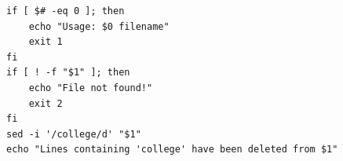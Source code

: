 \begin{verbatim}
if [ $# -eq 0 ]; then
    echo "Usage: $0 filename"
    exit 1
fi
if [ ! -f "$1" ]; then
    echo "File not found!"
    exit 2
fi
sed -i '/college/d' "$1"
echo "Lines containing 'college' have been deleted from $1"
\end{verbatim}